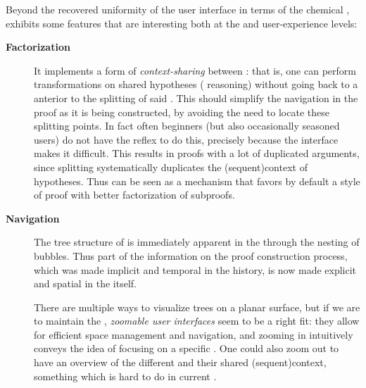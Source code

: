\begin{scope}
Beyond the recovered uniformity of the user interface in terms of the chemical
,  exhibits some features that are interesting both at the
 and user-experience levels:
\begin{description}
  \item[\textbf{Factorization}] It implements a form of \emph{context-sharing}
    between : that is, one can perform transformations on shared
    hypotheses ( reasoning) without going back to a  anterior
    to the splitting of said . This should simplify the navigation in
    the proof as it is being constructed, by avoiding the need to locate these
    splitting points. In fact often beginners (but also occasionally seasoned
    users) do not have the reflex to do this, precisely because the interface
    makes it difficult. This results in proofs with a lot of duplicated
    arguments, since splitting  systematically duplicates the \kl(sequent){context} of
    hypotheses. Thus  can be seen as a mechanism that favors by default a
    style of proof with better factorization of
    subproofs.\label{par:factorization}

  \item[\textbf{Navigation}] The tree structure of  is immediately
    apparent in the  through the nesting of bubbles. Thus part of the
    information on the proof construction process, which was made implicit and
    temporal in the  history, is now made explicit and spatial in the
     itself.
    
    There are multiple ways to visualize trees on a planar surface, but if we
    are to maintain the  , \emph{zoomable user interfaces} seem to
    be a right fit: they allow for efficient space management and navigation,
    and zooming in intuitively conveys the idea of focusing on a specific
    . One could also zoom out to have an overview of the different
     and their shared \kl(sequent){context}, something which is hard to do in current
    .
    

\end{description}
\end{scope}
